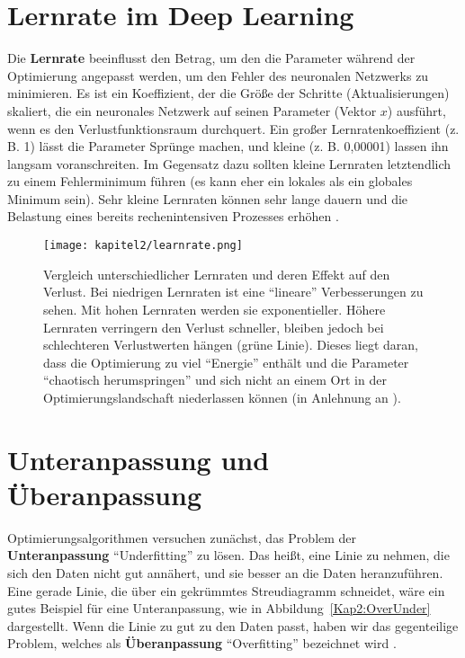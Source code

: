         \section{Lernrate im Deep Learning}
        Die \textbf{Lernrate} beeinflusst den Betrag, um den die Parameter während der Optimierung angepasst werden, um den Fehler des neuronalen Netzwerks zu minimieren. Es ist ein Koeffizient, der die Größe der Schritte (Aktualisierungen) skaliert, die ein neuronales Netzwerk auf seinen Parameter (Vektor $x$) ausführt, wenn es den Verlustfunktionsraum durchquert. Ein großer Lernratenkoeffizient (z. B. 1) lässt die Parameter Sprünge machen, und kleine (z. B. 0,00001) lassen ihn langsam voranschreiten. Im Gegensatz dazu sollten kleine Lernraten letztendlich zu einem Fehlerminimum führen (es kann eher ein lokales als ein globales Minimum sein). Sehr kleine Lernraten können sehr lange dauern und die Belastung eines bereits rechenintensiven Prozesses erhöhen  \cite*[77]{Patterson2019}.


        \begin{figure}[H]
            \centering
            \texttt{[image: kapitel2/learnrate.png]}
            \caption[Einfluss der Lernrate auf den Verlust]{Vergleich unterschiedlicher Lernraten und deren Effekt auf den Verlust. Bei niedrigen Lernraten ist eine \enquote{lineare} Verbesserungen zu sehen. Mit hohen Lernraten werden sie exponentieller. Höhere Lernraten verringern den Verlust schneller, bleiben jedoch bei schlechteren Verlustwerten hängen (grüne Linie). Dieses liegt daran, dass die Optimierung zu viel \enquote{Energie} enthält und die Parameter \enquote{chaotisch herumspringen} und sich nicht an einem Ort in der Optimierungslandschaft niederlassen können (in Anlehnung an \cite*{StanfordUniversityCoursecs231n2018}). }
            \label{Kap2:Lern}
        \end{figure}

        \section{Unteranpassung und Überanpassung}
        Optimierungsalgorithmen versuchen zunächst, das Problem der \textbf{Unteranpassung} \enquote{Underfitting} zu lösen. Das heißt, eine Linie zu nehmen, die sich den Daten nicht gut annähert, und sie besser an die Daten heranzuführen. Eine gerade Linie, die über ein gekrümmtes Streudiagramm schneidet, wäre ein gutes Beispiel für eine Unteranpassung, wie in Abbildung~\ref{Kap2:OverUnder} dargestellt. Wenn die Linie zu gut zu den Daten passt, haben wir das gegenteilige Problem, welches als \textbf{Überanpassung} \enquote{Overfitting} bezeichnet wird \cite*[27]{Patterson2019}.

